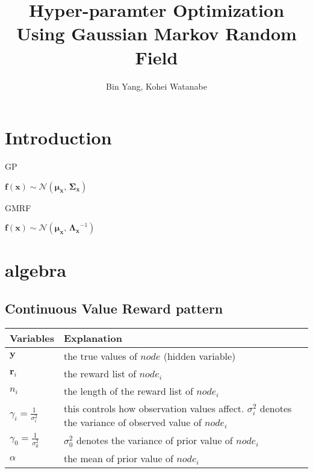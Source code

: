 \documentclass[platex, a4paper]{jsarticle}
\begin{document}
\title{Hyper-paramter Optimization \\ Using Gaussian Markov Random Field}
\author{Bin Yang, Kohei Watanabe}
\maketitle

\section{Introduction}
GP

$\bm{f}(\bm{x}) \sim \mathcal{N}(\bm{\mu_x},\,\bm{\Sigma_x})$

GMRF

$\bm{f}(\bm{x}) \sim \mathcal{N}(\bm{\mu_x},\,\bm{\Lambda_x}^{-1})$

\section{algebra}

\subsection{Continuous Value Reward pattern}

\begin{table}[htb]
\begin{tabular}{ll} \toprule
Variables & Explanation \\ \toprule
$\bm{y}$ & the true values of $node$ (hidden variable) \\
$\bm{r}_i$ & the reward list of $node_i$ \\
$n_i$ & the length of the reward list of $node_i$ \\
$\gamma_i=\frac{1}{\sigma_i^2}$ & this controls how observation values affect. $\sigma_i^2$ denotes the variance of observed value of $node_i$ \\
$\gamma_0=\frac{1}{\sigma_0^2}$ & $\sigma_0^2$ denotes the variance of prior value of $node_i$ \\
$\alpha$ & the mean of prior value of $node_i$ \\ \bottomrule
\end{tabular}
\end{table}
\end{document}
